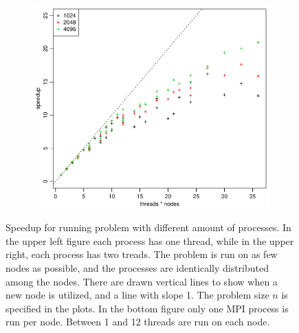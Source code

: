 \documentclass[norsk]{article} %
\numberwithin{equation}{section} %
\numberwithin{figure}{section} %
\numberwithin{table}{section} %
\begin{document}
\begin{figure}[h!]
  \quad
  \begin{subfigure}[b]{0.48\textwidth}
    \includegraphics[width=\textwidth]{./Figures/taskbSpeedupNodesTimesThreads.pdf}
  \end{subfigure}
  \vspace{1\baselineskip}
  \caption{Speedup for running problem with different amount of processes. In the upper left figure each process has one thread, while in the upper right, each process has two treads. The problem is run on as few nodes as possible, and the processes are identically distributed among the nodes. There are drawn vertical lines to show when a new node is utilized, and a line with slope 1. The problem size $n$ is specified in the plots. In the bottom figure only one MPI process is run per node. Between 1 and 12 threads are run on each node.}
  \label{fig:Speedup}
\end{figure}
%
\end{document}
